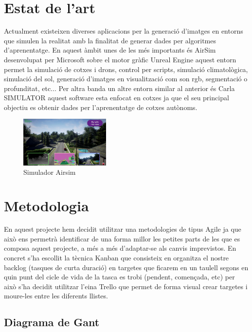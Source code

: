 \documentclass[10pt,a4paper]{article}
\begin{document}
\section{Estat de l'art}
\label{estatart}

Actualment existeixen diverses aplicacions per la generació d'imatges en entorns que simulen la realitat amb la finalitat de generar dades per algoritmes d'aprenentatge.
En aquest àmbit unes de les més importants és AirSim \cite{airsim} desenvolupat per Microsoft sobre el motor gràfic Unreal Engine aquest entorn permet la simulació de cotxes i drons, control per scripts, simulació climatològica, simulació del sol, generació d'imatges en visualització com son rgb, segmentació o profunditat, etc... Per altra banda un altre entorn similar al anterior és Carla SIMULATOR \cite{carla} aquest software esta enfocat en cotxes ja que el seu principal objectiu es obtenir dades per l'aprenentatge de cotxes autònoms.

\begin{figure}[!h]
\centering
  	\includegraphics[width=0.4\textwidth]{airsim}
	\caption{Simulador Airsim}
	\label{fig-airsim}
\end{figure}


\section{Metodologia}

En aquest projecte hem decidit utilitzar una metodologies de tipus Agile \cite{agile} ja que això ens permetrà identificar de una forma millor les petites parts de les que es composa aquest projecte, a més a més d'adaptar-se als canvis imprevistos. En concret s'ha escollit la tècnica Kanban \cite{kanban} que consisteix en organitza el nostre backlog (tasques de curta duració) en 
targetes que ficarem en un taulell segons en quin punt del cicle de vida de la tasca es trobi (pendent, començada, etc) per això s'ha decidit utilitzar l'eina Trello \cite{trello} que permet de forma visual crear targetes i moure-les entre les diferents llistes.

\newpage
\subsection{Diagrama de Gant}
\end{document}
